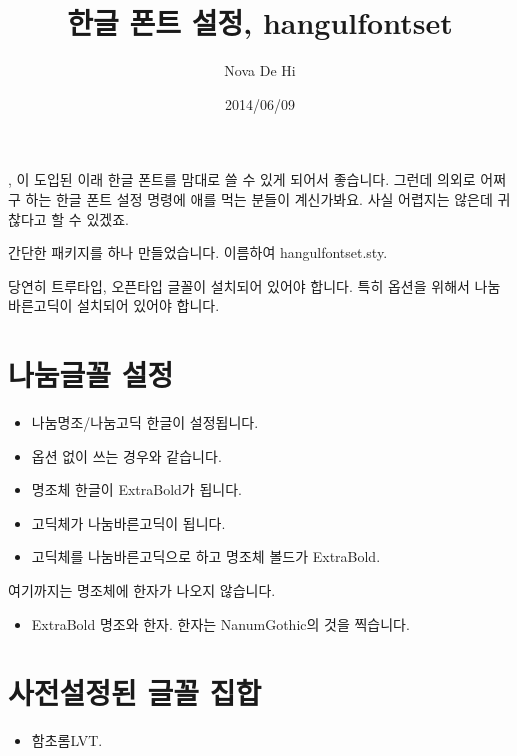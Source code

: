 \documentclass[b5paper,nanum]{oblivoir}
\begin{document}
\title{한글 폰트 설정, hangulfontset}
\author{Nova De Hi}
\date{2014/06/09}

\maketitle

, 이 도입된 이래 한글 폰트를 맘대로 쓸 수 있게 되어서 좋습니다.
그런데 의외로  어쩌구 하는 한글 폰트 설정 명령에 애를 먹는 분들이 계신가봐요.
사실 어렵지는 않은데 귀찮다고 할 수 있겠죠.

간단한 패키지를 하나 만들었습니다. 이름하여 hangulfontset.sty.

당연히 트루타입, 오픈타입 글꼴이 설치되어 있어야 합니다. 특히 \ct{[barun]} 옵션을 위해서 나눔바른고딕이 설치되어
있어야 합니다.

\section{나눔글꼴 설정}

\begin{itemize}\tightlist
\item {} 나눔명조/나눔고딕 한글이 설정됩니다.
\item {} 옵션 없이 쓰는 경우와 같습니다.
\item {} 명조체 한글이 ExtraBold가 됩니다.
\item {} 고딕체가 나눔바른고딕이 됩니다.
\item {} 고딕체를 나눔바른고딕으로 하고 명조체 볼드가 ExtraBold.
\end{itemize}

여기까지는 명조체에 한자가 나오지 않습니다.

\begin{itemize}
\item {} ExtraBold 명조와 한자. 한자는 NanumGothic의 것을 찍습니다.
\end{itemize}

\section{사전설정된 글꼴 집합}

\begin{itemize}
\item {} 함초롬LVT.
\end{itemize}
\end{document}
